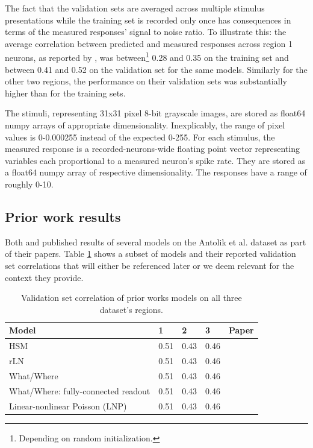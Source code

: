 The fact that the validation sets are averaged across multiple stimulus presentations while the training set is recorded only once has consequences in terms of the measured responses’ signal to noise ratio. To illustrate this: the average correlation between predicted and measured responses across region 1 neurons, as reported by \cite{antolik}, was between\footnote{Depending on random initialization.} 0.28 and 0.35 on the training set and between 0.41 and 0.52 on the validation set for the same models. Similarly for the other two regions, the performance on their validation sets was substantially higher than for the training sets. 

The stimuli, representing 31x31 pixel 8-bit grayscale images, are stored as float64 numpy arrays of appropriate dimensionality. Inexplicably, the range of pixel values is 0-0.000255 instead of the expected 0-255. For each stimulus, the measured response is a recorded-neurons-wide floating point vector representing variables each proportional to a measured neuron’s spike rate. They are stored as a float64 numpy array of respective dimensionality. The responses have a range of roughly 0-10.

\subsection{Prior work results}\label{ch:4.1.2}

Both \cite{antolik} and \cite{klindt} published results of several models on the Antolik et al. dataset as part of their papers. Table \ref{tab:4.2} shows a subset of models and their reported validation set correlations that will either be referenced later or we deem relevant for the context they provide.

\begin{table}[ht]
    \renewcommand{\arraystretch}{1.0}
    \centering
    \begin{tabular}{l|l|l|l|l}
        \toprule
        \textbf{Model} & \textbf{1} & \textbf{2} & \textbf{3} & \textbf{Paper} \\ \midrule
        HSM & 0.51 & 0.43 & 0.46 & \citeauthor{antolik} \\ 
        rLN & 0.51 & 0.43 & 0.46 & \citeauthor{antolik} \\ 
        What/Where & 0.51 & 0.43 & 0.46 & \citeauthor{antolik} \\ 
        What/Where: fully-connected readout & 0.51 & 0.43 & 0.46 & \citeauthor{klindt} \\ 
        Linear-nonlinear Poisson (LNP) & 0.51 & 0.43 & 0.46 & \citeauthor{klindt} \\ \bottomrule
    \end{tabular}
    \caption[Performance of prior works.]{Validation set correlation of prior works models on all three dataset’s regions.}
    \label{tab:4.2}
    \renewcommand{\arraystretch}{1.0}
\end{table}


